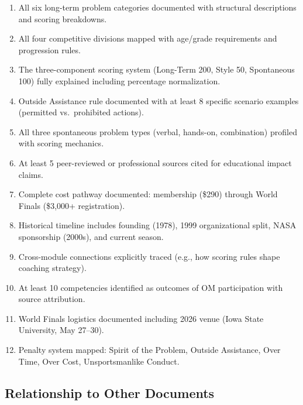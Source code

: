 \documentclass[11pt,letterpaper]{article}
\begin{document}
\begin{enumerate}[leftmargin=2em]
\item All six long-term problem categories documented with structural descriptions and scoring breakdowns.
\item All four competitive divisions mapped with age/grade requirements and progression rules.
\item The three-component scoring system (Long-Term 200, Style 50, Spontaneous 100) fully explained including percentage normalization.
\item Outside Assistance rule documented with at least 8 specific scenario examples (permitted vs.\ prohibited actions).
\item All three spontaneous problem types (verbal, hands-on, combination) profiled with scoring mechanics.
\item At least 5 peer-reviewed or professional sources cited for educational impact claims.
\item Complete cost pathway documented: membership (\$290) through World Finals (\$3,000+ registration).
\item Historical timeline includes founding (1978), 1999 organizational split, NASA sponsorship (2000s), and current season.
\item Cross-module connections explicitly traced (e.g., how scoring rules shape coaching strategy).
\item At least 10 competencies identified as outcomes of OM participation with source attribution.
\item World Finals logistics documented including 2026 venue (Iowa State University, May 27--30).
\item Penalty system mapped: Spirit of the Problem, Outside Assistance, Over Time, Over Cost, Unsportsmanlike Conduct.
\end{enumerate}

\subsection{Relationship to Other Documents}
\end{document}
